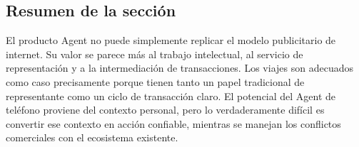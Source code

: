\subsection{Resumen de la sección}

El producto Agent no puede simplemente replicar el modelo publicitario de internet. Su valor se parece más al trabajo intelectual, al servicio de representación y a la intermediación de transacciones. Los viajes son adecuados como caso precisamente porque tienen tanto un papel tradicional de representante como un ciclo de transacción claro. El potencial del Agent de teléfono proviene del contexto personal, pero lo verdaderamente difícil es convertir ese contexto en acción confiable, mientras se manejan los conflictos comerciales con el ecosistema existente.
